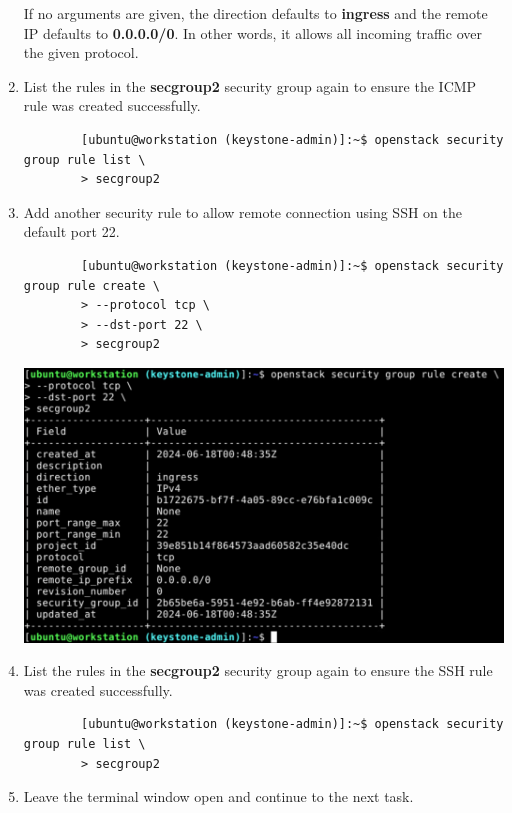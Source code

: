 \documentclass[letterpaper, 12pt]{article}
\begin{document}
\begin{enumerate}
    \begin{notebox}
        If no arguments are given, the direction defaults to \textbf{ingress} and the remote IP defaults to \textbf{0.0.0.0/0}.
        In other words, it allows all incoming traffic over the given protocol.
    \end{notebox}

    \item List the rules in the \textbf{secgroup2} security group again to ensure the ICMP rule was created successfully.
    \begin{lstlisting}
        [ubuntu@workstation (keystone-admin)]:~$ openstack security group rule list \
        > secgroup2
    \end{lstlisting}

    \item Add another security rule to allow remote connection using SSH on the default port 22.
    \begin{lstlisting}
        [ubuntu@workstation (keystone-admin)]:~$ openstack security group rule create \
        > --protocol tcp \
        > --dst-port 22 \
        > secgroup2
    \end{lstlisting}

    \begin{center}
        \includegraphics[width=\linewidth]{images/part5/step16.png}
    \end{center}

    \item List the rules in the \textbf{secgroup2} security group again to ensure the SSH rule was created successfully.
    \begin{lstlisting}
        [ubuntu@workstation (keystone-admin)]:~$ openstack security group rule list \
        > secgroup2
    \end{lstlisting}

    \item Leave the terminal window open and continue to the next task.

\end{enumerate}
\end{document}

